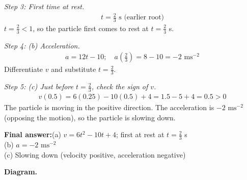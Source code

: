 \documentclass[11pt]{article}
\begin{document}
\textit{Step 3: First time at rest.}
\[\begin{gathered}
t = \tfrac{2}{3} \text{ s (earlier root)}
\end{gathered}\]
\( t = \tfrac{2}{3} < 1 \), so the particle first comes to rest at \( t = \tfrac{2}{3} \) s.

\textit{Step 4: (b) Acceleration.}
\[\begin{gathered}
a = 12t - 10; \quad a\!\left(\tfrac{2}{3}\right) = 8 - 10 = -2 \text{ ms}^{-2}
\end{gathered}\]
Differentiate \( v \) and substitute \( t = \tfrac{2}{3} \).

\textit{Step 5: (c) Just before \( t = \tfrac{2}{3} \), check the sign of \( v \).}
\[\begin{gathered}
v(0.5) = 6(0.25) - 10(0.5) + 4 = 1.5 - 5 + 4 = 0.5 > 0
\end{gathered}\]
The particle is moving in the positive direction. The acceleration is \(-2 \text{ ms}^{-2}\) (opposing the motion), so the particle is slowing down.

\begin{answerbox}
\textbf{Final answer:}\quad (a) \(\displaystyle  v = 6t^2-10t+4 \); first at rest at \(\displaystyle  t = \tfrac{2}{3} \) s \\[3pt]  (b) \(\displaystyle  a = -2 \text{ ms}^{-2} \) \\[3pt]  (c) Slowing down (velocity positive, acceleration negative)
\end{answerbox}
\textbf{Diagram.}
\end{document}
